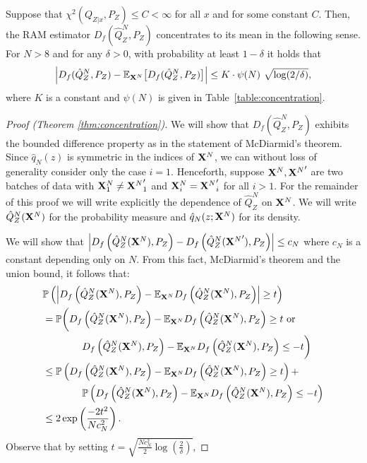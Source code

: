 \begin{theorem}
Suppose that ${\chi^2\left(Q_{Z|x} , P_Z\right) \leq C < \infty}$ for all $x$ and for some constant $C$.
Then, the RAM estimator ${D_f( \hat{Q}_Z^N , P_Z)}$ concentrates to its mean in the following sense. 
For $N>8$ and for any $\delta >0$, with probability at least $1-\delta$ it holds that
\begin{align*}
    \left| D_f( \hat{Q}_Z^N , P_Z) - \mathbb{E}_{\mathbf{X}^N} \bigl[D_f(\hat{Q}_Z^N , P_Z)\bigr] \right| \leq {K \cdot \psi(N)} \  \sqrt{\log (2/\delta)},
\end{align*}
where $K$ is a constant and $\psi(N)$ is given in Table~\ref{table:concentration}.
\end{theorem}
\begin{proof}[Proof (Theorem \ref{thm:concentration})]
We will show that $D_f\left( \hat{Q}_Z^N , P_Z\right)$ exhibits the bounded difference property as in the statement of McDiarmid's theorem.
Since $\hat{q}_N(z)$ is symmetric in the indices of $\mathbf{X}^N$, we can without loss of generality consider only the case $i=1$.
Henceforth, suppose $\mathbf{X}^N, {\mathbf{X}^N}'$ are two batches of data with $\mathbf{X}^N_1 \not= {\mathbf{X}^N}'_1$ and $\mathbf{X}^N_i = {\mathbf{X}^N}'_i$ for all $i > 1$. 
For the remainder of this proof we will write explicitly the dependence of $\hat{Q}_Z^N$ on $\mathbf{X}^N$. 
We will write $\hat{Q}_Z^N(\mathbf{X}^N)$ for the probability measure and $\hat{q}_N(z; \mathbf{X}^N)$ for its density.


We will show that $\left|D_f\left( \hat{Q}_Z^N(\mathbf{X}^N) , P_Z\right) - D_f\left( \hat{Q}_Z^N({\mathbf{X}^N}') , P_Z\right)\right| \leq c_N$ where $c_N$ is a constant depending only on $N$.
From this fact, McDiarmid's theorem and the union bound, it follows that:
\begin{align*}
    &\mathbb{P}\left( \left| D_f\left( \hat{Q}_Z^N(\mathbf{X}^N) , P_Z\right) - \mathbb{E}_{\mathbf{X}^N} D_f\left( \hat{Q}_Z^N(\mathbf{X}^N) , P_Z\right) \right|\geq t \right) \\
    &= \mathbb{P}\bigg( D_f\left( \hat{Q}_Z^N(\mathbf{X}^N) , P_Z\right) - \mathbb{E}_{\mathbf{X}^N} D_f\left( \hat{Q}_Z^N(\mathbf{X}^N) , P_Z\right) \geq t \text{ or }\\
    & \qquad \qquad D_f\left( \hat{Q}_Z^N(\mathbf{X}^N) , P_Z\right) - \mathbb{E}_{\mathbf{X}^N} D_f\left( \hat{Q}_Z^N(\mathbf{X}^N) , P_Z\right) \leq -t\bigg) \\
    &\leq \mathbb{P}\left( D_f\left( \hat{Q}_Z^N(\mathbf{X}^N) , P_Z\right) - \mathbb{E}_{\mathbf{X}^N} D_f\left( \hat{Q}_Z^N(\mathbf{X}^N) , P_Z\right) \geq t \right) 
    + \\
    & \qquad \qquad \mathbb{P}\left( D_f\left( \hat{Q}_Z^N(\mathbf{X}^N) , P_Z\right) - \mathbb{E}_{\mathbf{X}^N} D_f\left( \hat{Q}_Z^N(\mathbf{X}^N) , P_Z\right) \leq -t\right) \\
    &\leq 2 \exp\left(\frac{-2 t^2 }{Nc^2_N} \right).
\end{align*}
Observe that by setting $t = \sqrt{\frac{Nc_N^2}{2} \log\left(\frac{2}{\delta}\right)}$, 


\end{proof}
